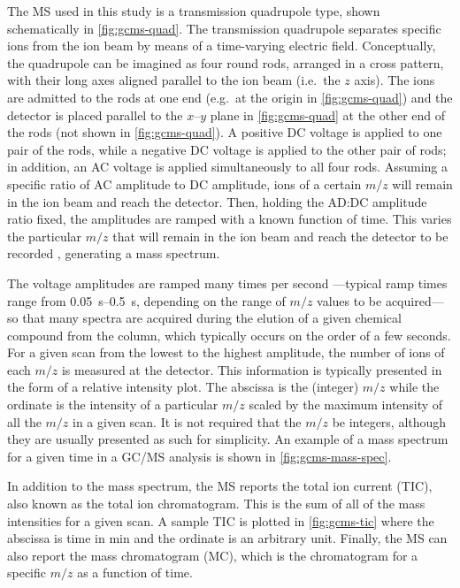 \documentclass[../main.tex]{subfiles}
\begin{document}
The MS used in this study is a transmission quadrupole type, shown
schematically in \cref{fig:gcms-quad}. The transmission quadrupole separates
specific ions from the ion beam by
means of a time-varying electric field. Conceptually, the quadrupole
can be imagined as four round rods, arranged in a cross pattern, with
their long axes aligned parallel to the ion beam (i.e.\ the $z$ axis).
The ions are admitted to the rods at one end (e.g.\ at the origin in
\cref{fig:gcms-quad}) and the detector is placed parallel to the $x\text{--}y$ plane
in \cref{fig:gcms-quad} at the other end of the rods (not shown in
\cref{fig:gcms-quad}). A positive DC voltage is applied
to one pair of the rods, while a negative DC voltage is applied to the other
pair of rods; in addition, an AC voltage is applied simultaneously to all four
rods. Assuming a specific ratio of AC amplitude to DC amplitude, ions of a certain
$m/z$ will remain in the ion beam and reach the detector.
Then, holding the AD:DC amplitude ratio fixed, the amplitudes are ramped with a known
function of time. This varies the particular $m/z$ that will remain in the ion beam
and reach the detector to be recorded \cite{Sparkman2011}, generating a mass spectrum.

The voltage amplitudes are ramped many times per second%
---typical ramp times range from \SIrange{0.05}{0.5}{\second},
depending on the range of $m/z$ values to be acquired---so that many
spectra are acquired during the elution of a given chemical compound
from the column, which typically occurs on the order of a few seconds.
For a given scan from the lowest to the highest amplitude, the number of ions
of each $m/z$ is measured at the detector. This information is
typically presented in the form of a relative intensity plot. The abscissa
is the (integer) $m/z$ while the ordinate is the intensity of a particular
$m/z$ scaled by the maximum intensity of all the $m/z$ in a given scan. It
is not required that the $m/z$ be integers, although they are usually presented
as such for simplicity. An example of a mass spectrum for a given time in a
GC/MS analysis is shown in \cref{fig:gcms-mass-spec}.

In addition to the mass spectrum, the MS reports the total ion current (TIC),
also known as the total ion chromatogram. This is the sum of all of the mass
intensities for a given scan. A sample TIC is plotted in \cref{fig:gcms-tic}
where the abscissa is time in \si{\minute} and the ordinate is an arbitrary unit.
Finally, the MS can also report the mass chromatogram (MC), which is the
chromatogram for a specific $m/z$ as a function of time.
\end{document}
